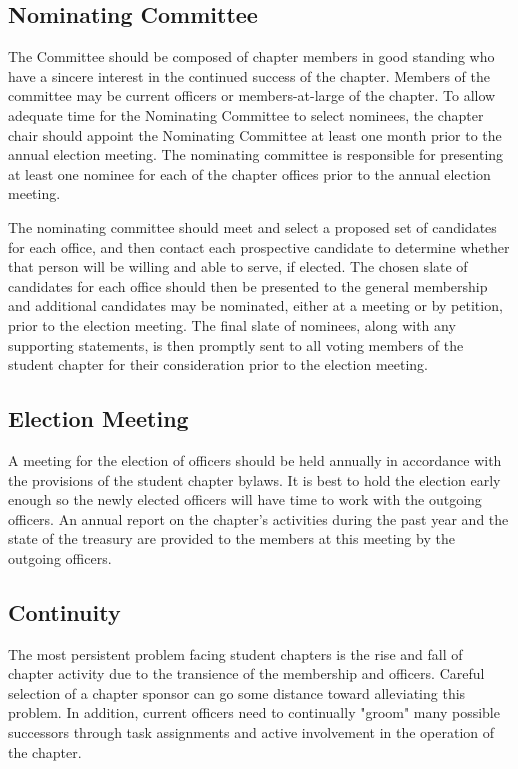 \subsection*{Nominating Committee}
The Committee should be composed of chapter members in good standing who have a sincere interest in the continued success of the chapter. Members of the committee may be current officers or members-at-large of the chapter. To allow adequate time for the Nominating Committee to select nominees, the chapter chair should appoint the Nominating Committee at least one month prior to the annual election meeting. The nominating committee is responsible for presenting at least one nominee for each of the chapter offices prior to the annual election meeting.

The nominating committee should meet and select a proposed set of candidates for each office, and then contact each prospective candidate to determine whether that person will be willing and able to serve, if elected. The chosen slate of candidates for each office should then be presented to the general membership and additional candidates may be nominated, either at a meeting or by petition, prior to the election meeting. The final slate of nominees, along with any supporting statements, is then promptly sent to all voting members of the student chapter for their consideration prior to the election meeting.
\subsection*{Election Meeting}
A meeting for the election of officers should be held annually in accordance with the provisions of the student chapter bylaws. It is best to hold the election early enough so the newly elected officers will have time to work with the outgoing officers. An annual report on the chapter's activities during the past year and the state of the treasury are provided to the members at this meeting by the outgoing officers.
\subsection*{Continuity}
The most persistent problem facing student chapters is the rise and fall of chapter activity due to the transience of the membership and officers. Careful selection of a chapter sponsor can go some distance toward alleviating this problem. In addition, current officers need to continually "groom" many possible successors through task assignments and active involvement in the operation of the chapter.

